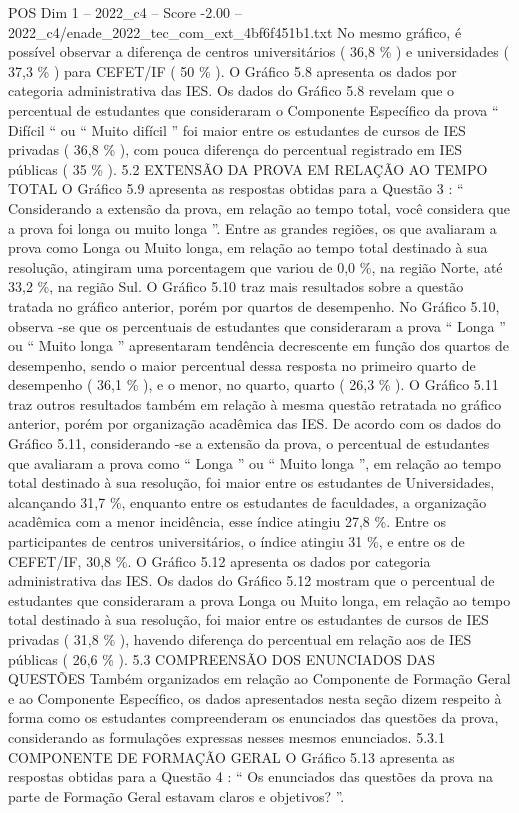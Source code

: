 \begin{textsample}{POS Dim 1 – 2022\_c4 – Score -2.00 – 2022\_c4/enade\_2022\_tec\_com\_ext\_4bf6f451b1.txt}
No mesmo gráfico, é possível observar a diferença de centros universitários ( 36,8 \% ) e universidades ( 37,3 \% ) para CEFET/IF ( 50 \% ).
O Gráfico 5.8 apresenta os dados por categoria administrativa das IES.
Os dados do Gráfico 5.8 revelam que o percentual de estudantes que consideraram o Componente Específico da prova “ Difícil “ ou “ Muito difícil ” foi maior entre os estudantes de cursos de IES privadas ( 36,8 \% ), com pouca diferença do percentual registrado em IES públicas ( 35 \% ). 5.2 EXTENSÃO DA PROVA EM RELAÇÃO AO TEMPO TOTAL O Gráfico 5.9 apresenta as respostas obtidas para a Questão 3 : “ Considerando a extensão da prova, em relação ao tempo total, você considera que a prova foi longa ou muito longa ”.
Entre as grandes regiões, os que avaliaram a prova como Longa ou Muito longa, em relação ao tempo total destinado à sua resolução, atingiram uma porcentagem que variou de 0,0 \%, na região Norte, até 33,2 \%, na região Sul.
O Gráfico 5.10 traz mais resultados sobre a questão tratada no gráfico anterior, porém por quartos de desempenho.
No Gráfico 5.10, observa -se que os percentuais de estudantes que consideraram a prova “ Longa ” ou “ Muito longa ” apresentaram tendência decrescente em função dos quartos de desempenho, sendo o maior percentual dessa resposta no primeiro quarto de desempenho ( 36,1 \% ), e o menor, no quarto, quarto ( 26,3 \% ).
O Gráfico 5.11 traz outros resultados também em relação à mesma questão retratada no gráfico anterior, porém por organização acadêmica das IES.
De acordo com os dados do Gráfico 5.11, considerando -se a extensão da prova, o percentual de estudantes que avaliaram a prova como “ Longa ” ou “ Muito longa ”, em relação ao tempo total destinado à sua resolução, foi maior entre os estudantes de Universidades, alcançando 31,7 \%, enquanto entre os estudantes de faculdades, a organização acadêmica com a menor incidência, esse índice atingiu 27,8 \%.
Entre os participantes de centros universitários, o índice atingiu 31 \%, e entre os de CEFET/IF, 30,8 \%.
O Gráfico 5.12 apresenta os dados por categoria administrativa das IES.
Os dados do Gráfico 5.12 mostram que o percentual de estudantes que consideraram a prova Longa ou Muito longa, em relação ao tempo total destinado à sua resolução, foi maior entre os estudantes de cursos de IES privadas ( 31,8 \% ), havendo diferença do percentual em relação aos de IES públicas ( 26,6 \% ). 5.3 COMPREENSÃO DOS ENUNCIADOS DAS QUESTÕES Também organizados em relação ao Componente de Formação Geral e ao Componente Específico, os dados apresentados nesta seção dizem respeito à forma como os estudantes compreenderam os enunciados das questões da prova, considerando as formulações expressas nesses mesmos enunciados. 5.3.1 COMPONENTE DE FORMAÇÃO GERAL O Gráfico 5.13 apresenta as respostas obtidas para a Questão 4 : “ Os enunciados das questões da prova na parte de Formação Geral estavam claros e objetivos? ”.

\end{textsample}
